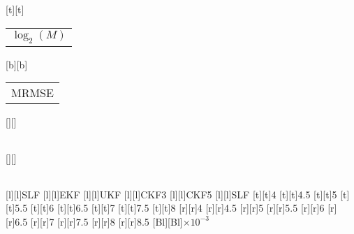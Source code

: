 %
%
[t][t]{\color[rgb]{0,0,0}\setlength{\tabcolsep}{0pt}\begin{tabular}{c}$\log_2 (M)$\end{tabular}}%
[b][b]{\color[rgb]{0,0,0}\setlength{\tabcolsep}{0pt}\begin{tabular}{c}MRMSE\end{tabular}}%
[][]{\color[rgb]{0,0,0}\setlength{\tabcolsep}{0pt}\begin{tabular}{c} \end{tabular}}%
[][]{\color[rgb]{0,0,0}\setlength{\tabcolsep}{0pt}\begin{tabular}{c} \end{tabular}}%
[l][l]{\color[rgb]{0,0,0}SLF}%
[l][l]{\color[rgb]{0,0,0}EKF}%
[l][l]{\color[rgb]{0,0,0}UKF}%
[l][l]{\color[rgb]{0,0,0}CKF3}%
[l][l]{\color[rgb]{0,0,0}CKF5}%
[l][l]{\color[rgb]{0,0,0}SLF}%
%
[t][t]{4}%
[t][t]{4.5}%
[t][t]{5}%
[t][t]{5.5}%
[t][t]{6}%
[t][t]{6.5}%
[t][t]{7}%
[t][t]{7.5}%
[t][t]{8}%
%
[r][r]{4}%
[r][r]{4.5}%
[r][r]{5}%
[r][r]{5.5}%
[r][r]{6}%
[r][r]{6.5}%
[r][r]{7}%
[r][r]{7.5}%
[r][r]{8}%
[r][r]{8.5}%
[Bl][Bl]{$\times 10^{-3}$}%
%
%

